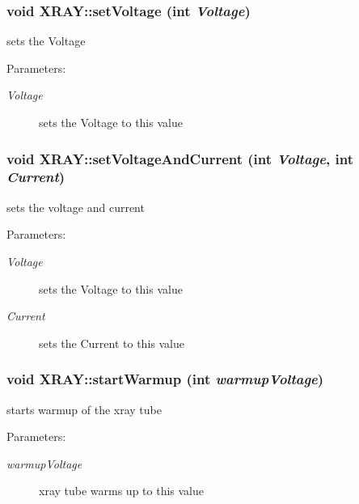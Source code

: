 \subsubsection{\setlength{\rightskip}{0pt plus 5cm}void XRAY::set\-Voltage (int {\em Voltage})}\label{classXRAY_20cf965585f449c2421f396b8c4523b1}


sets the Voltage \begin{Desc}
\item[Parameters:]
\begin{description}
\item[{\em Voltage}]sets the Voltage to this value \end{description}
\end{Desc}
\subsubsection{\setlength{\rightskip}{0pt plus 5cm}void XRAY::set\-Voltage\-And\-Current (int {\em Voltage}, int {\em Current})}\label{classXRAY_ffa9af3e1a0b2a2c055620bca3cfed40}


sets the voltage and current \begin{Desc}
\item[Parameters:]
\begin{description}
\item[{\em Voltage}]sets the Voltage to this value \item[{\em Current}]sets the Current to this value \end{description}
\end{Desc}
\subsubsection{\setlength{\rightskip}{0pt plus 5cm}void XRAY::start\-Warmup (int {\em warmup\-Voltage})}\label{classXRAY_bc636186850427b325c18989f85acbc3}


starts warmup of the xray tube \begin{Desc}
\item[Parameters:]
\begin{description}
\item[{\em warmup\-Voltage}]xray tube warms up to this value \end{description}
\end{Desc}



